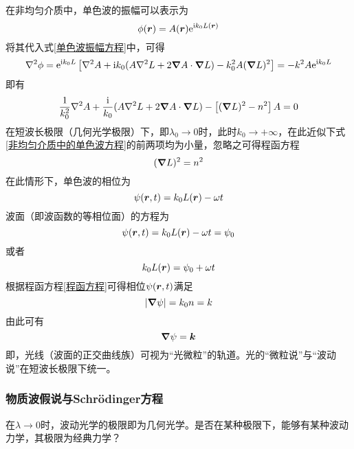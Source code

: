 在非均匀介质中，单色波的振幅可以表示为
\begin{equation*}
	\phi(\boldsymbol{r}) = A(\boldsymbol{r}) \mathrm{e}^{\mathrm{i}k_0 L(\boldsymbol{r})}
\end{equation*}
将其代入式\eqref{单色波振幅方程}中，可得
\begin{equation*}
	\nabla^2 \phi = \mathrm{e}^{\mathrm{i}k_0 L} \left[\nabla^2 A + \mathrm{i} k_0(A\nabla^2 L + 2\boldsymbol{\nabla} A \cdot \boldsymbol{\nabla} L) - k_0^2 A(\boldsymbol{\nabla} L)^2 \right] = -k^2 A \mathrm{e}^{\mathrm{i} k_0 L}
\end{equation*}
即有
\begin{equation}
	\frac{1}{k_0^2} \nabla^2 A + \frac{\mathrm{i}}{k_0} (A\nabla^2 L + 2\boldsymbol{\nabla} A \cdot \boldsymbol{\nabla} L) - \left[(\boldsymbol{\nabla} L)^2 - n^2\right] A = 0
	\label{非均匀介质中的单色波方程}
\end{equation}
在短波长极限（几何光学极限）下，即$\lambda_0 \to 0$时，此时$k_0 \to +\infty$，在此近似下式\eqref{非均匀介质中的单色波方程}的前两项均为小量，忽略之可得{\heiti 程函方程}
\begin{equation}
	(\boldsymbol{\nabla} L)^2 = n^2
	\label{程函方程}
\end{equation}
在此情形下，单色波的相位为
\begin{equation*}
	\psi(\boldsymbol{r},t) = k_0 L(\boldsymbol{r}) - \omega t
\end{equation*}
波面（即波函数的等相位面）的方程为
\begin{equation*}
	\psi(\boldsymbol{r},t) = k_0 L(\boldsymbol{r}) - \omega t = \psi_0
\end{equation*}
或者
\begin{equation*}
	k_0 L(\boldsymbol{r}) = \psi_0 + \omega t
\end{equation*}
根据程函方程\eqref{程函方程}可得相位$\psi(\boldsymbol{r},t)$满足
\begin{equation*}
	|\boldsymbol{\nabla} \psi| = k_0 n = k
\end{equation*}
由此可有
\begin{equation*}
	\boldsymbol{\nabla} \psi = \boldsymbol{k}
\end{equation*}
即，光线（波面的正交曲线族）可视为“光微粒”的轨道。光的“微粒说”与“波动说”在短波长极限下统一。

\subsubsection{物质波假说与Schr\"{o}dinger方程}

在$\lambda \to 0$时，波动光学的极限即为几何光学。是否在某种极限下，能够有某种波动力学，其极限为经典力学？

